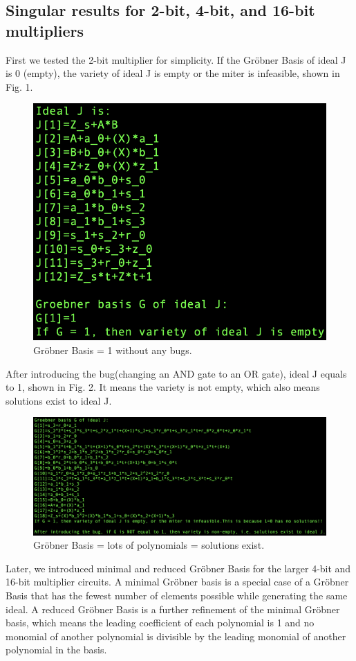 \documentclass[conference]{IEEEtran}
\begin{document}
\subsection{Singular results for 2-bit, 4-bit, and 16-bit multipliers}
First we tested the 2-bit multiplier for simplicity. If the Gröbner Basis of ideal {J} is 0 (empty), the variety of ideal {J} 
is empty or the miter is infeasible, shown in Fig. 1. 
\begin{figure}[ht]
    \centering
    \includegraphics[scale = 0.5]{2-bit-GB1.png}
    \caption{Gröbner Basis = 1 without any bugs.}
\end{figure}
After introducing the bug(changing an AND gate to an OR gate), ideal {J} equals to 1, 
shown in Fig. 2. It means the variety is not empty, which also means solutions exist to ideal {J}.   
\begin{figure}[ht]
    \centering
    \includegraphics[scale = 0.25]{2-bit-GB2.png}
    \caption{Gröbner Basis = lots of polynomials = solutions exist.}
\end{figure}
Later, we introduced minimal and reduced Gröbner Basis for the larger 4-bit and 16-bit multiplier circuits. 
A minimal Gröbner basis is a special case of a Gröbner Basis that has the fewest number of elements possible 
while generating the same ideal. A reduced Gröbner Basis is a further refinement of the minimal Gröbner basis,
which means the leading coefficient of each polynomial is 1 and no monomial of another polynomial  is divisible 
by the leading monomial of another polynomial in the basis. 
\end{document}
